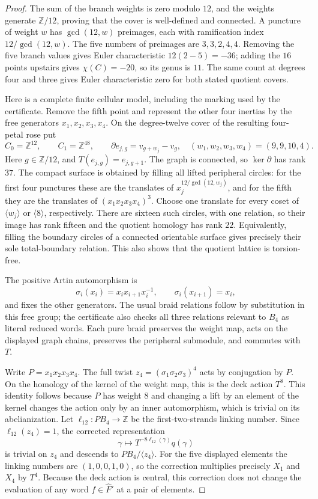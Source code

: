 \begin{proof}
The sum of the branch weights is zero modulo $12$, and the weights
generate $\mathbb Z/12$, proving that the cover is well-defined and
connected. A puncture of weight $w$ has $\gcd(12,w)$ preimages, each
with ramification index $12/\gcd(12,w)$. The five numbers of preimages
are $3,3,2,4,4$. Removing the five branch values gives Euler
characteristic $12(2-5)=-36$; adding the $16$ points upstairs gives
$\chi(C)=-20$, so its genus is $11$. The same count at degrees four
and three gives Euler characteristic zero for both stated quotient
covers.

Here is a complete finite cellular model, including the marking used
by the certificate. Remove the fifth point and represent the other four
inertias by the free generators $x_1,x_2,x_3,x_4$. On the degree-twelve
cover of the resulting four-petal rose put
\[
 C_0=\mathbb Z^{12},\qquad C_1=\mathbb Z^{48},\qquad
 \partial e_{j,g}=v_{g+w_j}-v_g,
 \quad(w_1,w_2,w_3,w_4)=(9,9,10,4).
\]
Here $g\in\mathbb Z/12$, and $T(e_{j,g})=e_{j,g+1}$.
The graph is connected, so $\ker\partial$ has rank $37$.
The compact surface is obtained by filling all lifted peripheral
circles: for the first four punctures these are the translates of
$x_j^{12/\gcd(12,w_j)}$, and for the fifth they are the translates of
$(x_1x_2x_3x_4)^3$. Choose one translate for every coset of
$\langle w_j\rangle$ or $\langle8\rangle$, respectively.
There are sixteen such circles, with one relation, so their image has
rank fifteen and the quotient homology has rank $22$.
Equivalently, filling the boundary circles of a connected orientable
surface gives precisely their sole total-boundary relation. This also
shows that the quotient lattice is torsion-free.

The positive Artin automorphism is
\[
 \sigma_i(x_i)=x_ix_{i+1}x_i^{-1},\qquad
 \sigma_i(x_{i+1})=x_i,
\]
and fixes the other generators. The usual braid relations follow by
substitution in this free group; the certificate also checks all three
relations relevant to $B_4$ as literal reduced words. Each pure braid
preserves the weight map, acts on the displayed graph chains, preserves
the peripheral submodule, and commutes with $T$.

Write $P=x_1x_2x_3x_4$. The full twist
$z_4=(\sigma_1\sigma_2\sigma_3)^4$ acts by conjugation by $P$.
On the homology of the kernel of the weight map, this is the deck
action $T^8$. This identity follows because $P$ has weight $8$ and
changing a lift by an element of the kernel changes the action only
by an inner automorphism, which is trivial on its abelianization.
Let $\ell_{12}:PB_4\to\mathbb Z$ be the first-two-strands linking
number. Since $\ell_{12}(z_4)=1$, the corrected representation
\[
 \gamma\longmapsto T^{-8\ell_{12}(\gamma)}q(\gamma)
\]
is trivial on $z_4$ and descends to $PB_4/\langle z_4\rangle$.
For the five displayed elements the linking numbers are
$(1,0,0,1,0)$, so the correction multiplies precisely $X_1$ and
$X_4$ by $T^4$. Because the deck action is central, this correction
does not change the evaluation of any word $f\in\widehat F'$ at a
pair of elements.


\end{proof}

